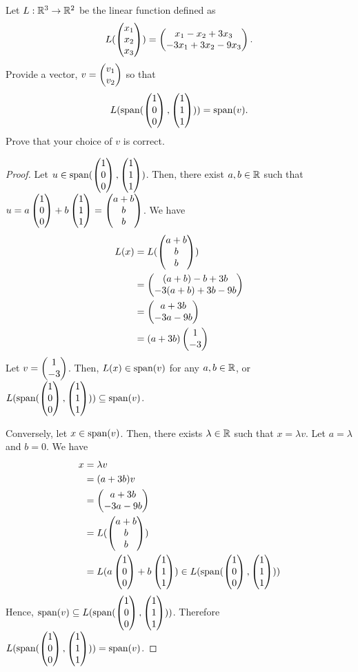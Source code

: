 \begin{question}
	\normalfont
	Let $L:{\mathbb R}^3\to{\mathbb R}^2$ be the linear function defined as
		\begin{align*}
			L(\begin{pmatrix} x_1\\ x_2\\ x_3\end{pmatrix}) = \begin{pmatrix} x_1-x_2+3x_3\\ -3x_1+3x_2-9x_3\end{pmatrix}.
		\end{align*}
		Provide a vector, $v=\begin{pmatrix} v_1\\ v_2\end{pmatrix}$ so that 
			\begin{align*}
				L(\textnormal{span}(\begin{pmatrix} 1\\ 0\\ 0\end{pmatrix}, \begin{pmatrix} 1\\ 1\\ 1\end{pmatrix} ) )= \textnormal{span}(v).
			\end{align*}
			Prove that your choice of $v$ is correct.
\end{question}

\begin{proof}
	\renewcommand{\qedsymbol}{$\blacksquare$}
	Let $u\in\textnormal{span}(\begin{pmatrix} 1\\ 0\\ 0\end{pmatrix},\begin{pmatrix} 1\\ 1\\ 1\end{pmatrix})$. Then, there exist $a,b\in\mathbb R$ such that $u=a \begin{pmatrix} 1\\ 0\\ 0\end{pmatrix}+b \begin{pmatrix} 1\\ 1\\ 1\end{pmatrix}=\begin{pmatrix} a+b\\ b\\ b\end{pmatrix}$.
	We have
	\begin{equation*}
		\begin{aligned}
			L(x)
			&= L(\begin{pmatrix} a+b\\ b\\ b\end{pmatrix})\\
			&= \begin{pmatrix} (a+b)-b+3b\\ -3(a+b)+3b-9b\end{pmatrix}\\
			&= \begin{pmatrix} a+3b\\ -3a-9b\end{pmatrix}\\
			&= (a+3b)\begin{pmatrix} 1\\ -3\end{pmatrix}
		\end{aligned}
	\end{equation*}
	Let $v=\begin{pmatrix} 1\\ -3\end{pmatrix}$. Then, $L(x)\in\textnormal{span}(v)$ for any $a,b\in\mathbb R$, or $L(\textnormal{span}(\begin{pmatrix} 1\\ 0\\ 0\end{pmatrix},\begin{pmatrix} 1\\ 1\\ 1\end{pmatrix}))\subseteq\textnormal{span}(v)$.

    Conversely, let $x\in\textnormal{span}(v)$. Then, there exists $\lambda\in\mathbb R$ such that $x=\lambda v$.
    Let $a=\lambda$ and $b=0$. We have 
    \[
        \begin{aligned}
            x 
            &= \lambda v\\
            &= (a+3b)v\\
            &= \begin{pmatrix} a+3b\\ -3a-9b\end{pmatrix}\\
            &= L(\begin{pmatrix} a+b\\ b\\ b\end{pmatrix})\\
            &= L(a \begin{pmatrix} 1\\ 0\\ 0\end{pmatrix}+b \begin{pmatrix} 1\\ 1\\ 1\end{pmatrix})\in L(\textnormal{span}(\begin{pmatrix} 1\\ 0\\ 0\end{pmatrix}, \begin{pmatrix} 1\\ 1\\ 1\end{pmatrix}))
        \end{aligned}
    \]
    Hence, $\textnormal{span}(v)\subseteq L(\textnormal{span}(\begin{pmatrix} 1\\ 0\\ 0\end{pmatrix},\begin{pmatrix} 1\\ 1\\ 1\end{pmatrix}))$.
    Therefore $L(\textnormal{span}(\begin{pmatrix} 1\\ 0\\ 0\end{pmatrix},\begin{pmatrix} 1\\ 1\\ 1\end{pmatrix}))=\textnormal{span}(v)$.
\end{proof}